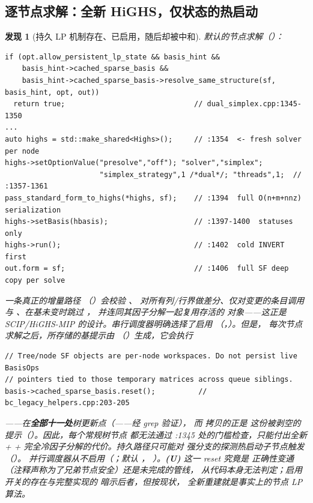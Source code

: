 \documentclass[11pt]{ctexart}
\newtheorem{finding}{发现}
\begin{document}
\subsection{逐节点求解：全新 HiGHS，仅状态的热启动}
\label{sec:node-solve}
\begin{finding}[持久 LP 机制存在、已启用，随后却被中和]
\label{find:persistent-lp}
默认的节点求解（）：
\begin{lstlisting}[style=code]
if (opt.allow_persistent_lp_state && basis_hint &&
    basis_hint->cached_sparse_basis &&
    basis_hint->cached_sparse_basis->resolve_same_structure(sf, basis_hint, opt, out))
  return true;                              // dual_simplex.cpp:1345-1350
...
auto highs = std::make_shared<Highs>();     // :1354  <- fresh solver per node
highs->setOptionValue("presolve","off"); "solver","simplex";
                      "simplex_strategy",1 /*dual*/; "threads",1;  // :1357-1361
pass_standard_form_to_highs(*highs, sf);    // :1394  full O(n+m+nnz) serialization
highs->setBasis(hbasis);                    // :1397-1400  statuses only
highs->run();                               // :1402  cold INVERT first
out.form = sf;                              // :1406  full SF deep copy per solve
\end{lstlisting}
一条真正的增量路径 
（）会校验 、
对所有列/行界做差分、仅对变更的条目调用  与
、在基未变时跳过 ，
并连同其因子分解一起复用存活的  对象——这正是
SCIP/HiGHS-MIP 的设计。串行调度器明确选择了启用
（，）。\emph{但是}，
每次节点求解之后，所存储的基提示由
（）生成，它会执行
\begin{lstlisting}[style=code]
// Tree/node SF objects are per-node workspaces. Do not persist live BasisOps
// pointers tied to those temporary matrices across queue siblings.
basis->cached_sparse_basis.reset();          // bc_legacy_helpers.cpp:203-205
\end{lstlisting}
——在\textbf{全部十一处}树更新点（——经 grep 验证），
而  拷贝的正是
这份被剥空的提示（）。因此，每个常规树节点
都无法通过 :1345 处的门槛检查，只能付出全新  +
 + 完全冷因子分解的代价。持久路径只可能对
强分支的探测热启动子节点触发（）。
并行调度器从不启用（；默认
，
）。\textbf{(U)} 这一 reset 究竟是
正确性变通（注释声称为了兄弟节点安全）还是未完成的管线，
从代码本身无法判定；启用开关的存在与完整实现的
 暗示后者，但按现状，
全新重建就是事实上的节点 LP 算法。
\end{finding}
\end{document}
